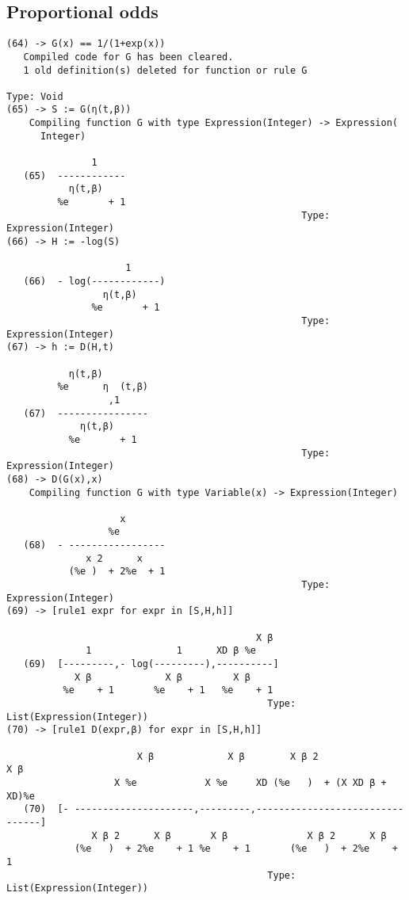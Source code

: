 \documentclass[11pt]{article}
\begin{document}
\subsection{Proportional odds}
\label{sec:orgheadline3}

\begin{verbatim}
(64) -> G(x) == 1/(1+exp(x))
   Compiled code for G has been cleared.
   1 old definition(s) deleted for function or rule G 
                                                                   Type: Void
(65) -> S := G(η(t,β))
    Compiling function G with type Expression(Integer) -> Expression(
      Integer) 

               1
   (65)  ------------
           η(t,β)
         %e       + 1
                                                    Type: Expression(Integer)
(66) -> H := -log(S)
 
                     1
   (66)  - log(------------)
                 η(t,β)
               %e       + 1
                                                    Type: Expression(Integer)
(67) -> h := D(H,t)
 
           η(t,β)
         %e      η  (t,β)
                  ,1
   (67)  ----------------
             η(t,β)
           %e       + 1
                                                    Type: Expression(Integer)
(68) -> D(G(x),x)
    Compiling function G with type Variable(x) -> Expression(Integer) 

                    x
                  %e
   (68)  - -----------------
              x 2      x
           (%e )  + 2%e  + 1
                                                    Type: Expression(Integer)
(69) -> [rule1 expr for expr in [S,H,h]]
 
                                            X β
              1               1      XD β %e
   (69)  [---------,- log(---------),----------]
            X β             X β         X β
          %e    + 1       %e    + 1   %e    + 1
                                              Type: List(Expression(Integer))
(70) -> [rule1 D(expr,β) for expr in [S,H,h]]
 
                       X β             X β        X β 2                  X β
                   X %e            X %e     XD (%e   )  + (X XD β + XD)%e
   (70)  [- ---------------------,---------,--------------------------------]
               X β 2      X β       X β              X β 2      X β
            (%e   )  + 2%e    + 1 %e    + 1       (%e   )  + 2%e    + 1
                                              Type: List(Expression(Integer))
\end{verbatim}
\end{document}
